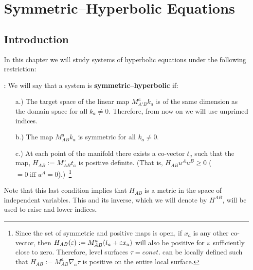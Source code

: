


\chapter{Symmetric--Hyperbolic Equations}

\section{Introduction}

In this chapter we will study systems of hyperbolic equations
under the following restriction:
\espa

: We will say that a system is {\bf symmetric--hyperbolic} if:

\begin{itemize}
\item[a.)] The target space of the linear map $M^a_{A'B}k_a$ is of
the same dimension as the domain space for all $k_a \neq 0$.
Therefore, from now on we will use unprimed indices.

\item[b.)] The map $M^a_{AB}k_a$ is symmetric for all $k_a \neq 0$.

\item[c.)] At each point of the manifold there exists a co-vector $t_{a}$ such that the map,
$H_{AB} := M^a_{AB}t_a$ is positive definite. (That is,
$H_{AB}u^Au^B \geq 0$ ($= 0\; \mbox{iff} \; u^A = 0$).)~\footnote{Since the set of symmetric and positive maps is open, if $x_{a}$ is any other co-vector, then $H_{AB}(\mbox{$\varepsilon$}) := M^a_{AB}(t_a+\mbox{$\varepsilon$} x_{a})$ will also be positive for $\mbox{$\varepsilon$}$ sufficiently close to zero. Therefore, level surfaces $\tau = const.$ can be locally defined such that $H_{AB} := M^a_{AB}\nabla_{a}\tau$ is positive on the entire local surface.}


\end{itemize}
Note that this last condition implies that $H_{AB}$ is a
metric in the space of independent variables. This and its inverse,
which we will denote by $H^{AB}$, will be used to raise and lower indices.

